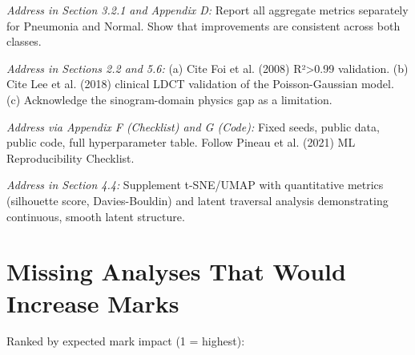 \documentclass[12pt, a4paper]{article}
\begin{document}
\begin{description}[style=nextline, leftmargin=0pt]
\item[\color{critred}C11 — Class imbalance]
\textit{Address in Section 3.2.1 and Appendix D:}
Report all aggregate metrics separately for Pneumonia and Normal.
Show that improvements are consistent across both classes.

\item[\color{critred}C12 — Simulated degradation]
\textit{Address in Sections 2.2 and 5.6:}
(a) Cite Foi et al. (2008) R²>0.99 validation.
(b) Cite Lee et al. (2018) clinical LDCT validation of the
Poisson-Gaussian model.
(c) Acknowledge the sinogram-domain physics gap as a limitation.

\item[\color{critred}C13 — Reproducibility]
\textit{Address via Appendix F (Checklist) and G (Code):}
Fixed seeds, public data, public code, full hyperparameter table.
Follow Pineau et al. (2021) ML Reproducibility Checklist.

\item[\color{critred}C14 — Interpretability beyond visualisation]
\textit{Address in Section 4.4:}
Supplement t-SNE/UMAP with quantitative metrics (silhouette score,
Davies-Bouldin) and latent traversal analysis demonstrating
continuous, smooth latent structure.

\end{description}

\section{Missing Analyses That Would Increase Marks}

\noindent Ranked by expected mark impact (1 = highest):
\end{document}
